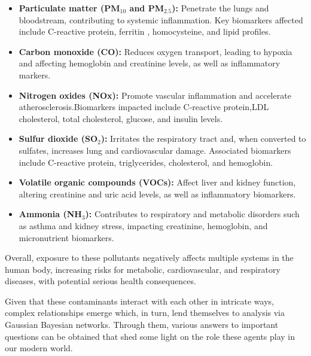 \documentclass[twocolumn]{article}
\begin{document}
\begin{itemize}
    \item \textbf{Particulate matter (PM$_{10}$ and PM$_{2.5}$):} Penetrate the lungs and bloodstream, contributing to systemic inflammation. Key biomarkers affected include C-reactive protein, ferritin , homocysteine, and lipid profiles.
    
    \item \textbf{Carbon monoxide (CO):} Reduces oxygen transport, leading to hypoxia and affecting hemoglobin  and creatinine levels, as well as inflammatory markers.
    
    \item \textbf{Nitrogen oxides (NOx):} Promote vascular inflammation and accelerate atherosclerosis.Biomarkers impacted include C-reactive protein,LDL cholesterol, total cholesterol, glucose, and insulin levels.
    
    \item \textbf{Sulfur dioxide (SO$_2$):} Irritates the respiratory tract and, when converted to sulfates, increases lung and cardiovascular damage. Associated biomarkers include C-reactive protein, triglycerides, cholesterol, and hemoglobin.
    
    \item \textbf{Volatile organic compounds (VOCs):} Affect liver and kidney function, altering creatinine and uric acid levels, as well as inflammatory biomarkers.
    
    \item \textbf{Ammonia (NH$_3$):} Contributes to respiratory and metabolic disorders such as asthma and kidney stress, impacting creatinine, hemoglobin, and micronutrient biomarkers.
\end{itemize}

Overall, exposure to these pollutants negatively affects multiple systems in the human body, increasing risks for metabolic, cardiovascular, and respiratory diseases, with potential serious health consequences.

Given that these contaminants interact with each other in intricate ways, complex relationships emerge which, in turn,  lend themselves to analysis via Gaussian Bayesian networks. Through them, various answers to important questions can be obtained that shed some light on the role these agents play in our modern world.
\end{document}
